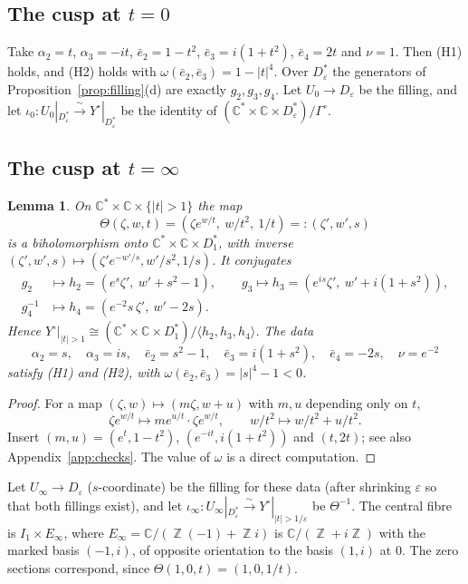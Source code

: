 \documentclass{article}
\DeclareMathOperator{\Z}{\mathbb{Z}}
\newtheorem{lemma}[theorem]{Lemma}
\theoremstyle{definition}
\theoremstyle{plain}
\newcommand{\C}{\mathbb{C}}
\newcommand{\eb}{\bar e}
\newcommand{\Yo}{Y^{\circ}}
\begin{document}
\subsection{The cusp at $t=0$}
Take $\alpha_2=t$, $\alpha_3=-it$, $\eb_2=1-t^2$, $\eb_3=i(1+t^2)$, $\eb_4=2t$ and $\nu=1$.
Then (H1) holds, and (H2) holds with $\omega(\eb_2,\eb_3)=1-|t|^4$. Over $D^*_\varepsilon$ the
generators of Proposition~\ref{prop:filling}(d) are exactly $g_2,g_3,g_4$. Let
$U_0\to D_\varepsilon$ be the filling, and let
$\iota_0\colon U_0|_{D^*_\varepsilon}\xrightarrow{\ \sim\ }\Yo|_{D^*_\varepsilon}$ be the
identity of $(\C^*\times\C\times D^*_\varepsilon)/\Gamma^\circ$.

\subsection{The cusp at $t=\infty$}
\begin{lemma}\label{lem:atinfty}
On $\C^*\times\C\times\{|t|>1\}$ the map
\[\Theta(\zeta,w,t)=(\zeta e^{w/t},\ w/t^2,\ 1/t)=:(\zeta',w',s)\]
is a biholomorphism onto $\C^*\times\C\times D^*_1$, with inverse
$(\zeta',w',s)\mapsto(\zeta'e^{-w'/s},w'/s^2,1/s)$. It conjugates
\begin{align*}
g_2&\mapsto h_2=(e^{s}\zeta',\ w'+s^2-1),\qquad
g_3\mapsto h_3=(e^{is}\zeta',\ w'+i(1+s^2)),\\
g_4^{-1}&\mapsto h_4=(e^{-2}s\,\zeta',\ w'-2s).
\end{align*}
Hence $\Yo|_{|t|>1}\cong(\C^*\times\C\times D^*_1)/\langle h_2,h_3,h_4\rangle$. The data
\[
\alpha_2=s,\quad \alpha_3=is,\quad \eb_2=s^2-1,\quad \eb_3=i(1+s^2),\quad \eb_4=-2s,\quad \nu=e^{-2}
\]
satisfy (H1) and (H2), with $\omega(\eb_2,\eb_3)=|s|^4-1<0$.
\end{lemma}
\begin{proof}
For a map $(\zeta,w)\mapsto(m\zeta,w+u)$ with $m,u$ depending only on $t$,
\[\zeta e^{w/t}\mapsto me^{u/t}\cdot\zeta e^{w/t},\qquad w/t^2\mapsto w/t^2+u/t^2.\]
Insert $(m,u)=(e^t,1-t^2)$, $(e^{-it},i(1+t^2))$ and $(t,2t)$; see also
Appendix~\ref{app:checks}. The value of $\omega$ is a direct computation.
\end{proof}

Let $U_\infty\to D_\varepsilon$ ($s$-coordinate) be the filling for these data (after
shrinking $\varepsilon$ so that both fillings exist), and let
$\iota_\infty\colon U_\infty|_{D^*_\varepsilon}\xrightarrow{\sim}\Yo|_{|t|>1/\varepsilon}$ be
$\Theta^{-1}$. The central fibre is $I_1\times E_\infty$, where $E_\infty=\C/(\Z(-1)+\Z i)$ is
$\C/(\Z+i\Z)$ with the marked basis $(-1,i)$, of opposite orientation to the basis
$(1,i)$ at $0$.
The zero sections correspond, since $\Theta(1,0,t)=(1,0,1/t)$.
\end{document}
